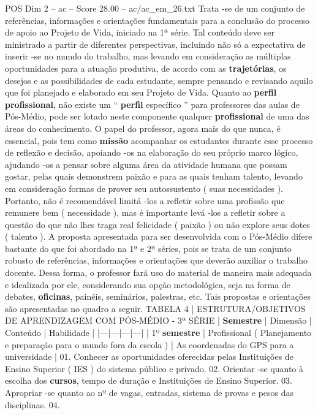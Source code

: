 \begin{textsample}{POS Dim 2 – ac – Score 28.00 – ac/ac\_em\_26.txt}
Trata -se de um conjunto de referências, informações e orientações fundamentais para a conclusão do processo de apoio ao Projeto de Vida, iniciado na 1ª série.
Tal conteúdo deve ser ministrado a partir de diferentes perspectivas, incluindo não só a expectativa de inserir -se no mundo do trabalho, mas levando em consideração as múltiplas oportunidades para a atuação produtiva, de acordo com as \textbf{trajetórias}, os desejos e as possibilidades de cada estudante, sempre pensando e revisando aquilo que foi planejado e elaborado em seu Projeto de Vida.
Quanto ao \textbf{perfil} \textbf{profissional}, não existe um “ \textbf{perfil} específico ” para professores das aulas de Pós-Médio, pode ser lotado neste componente qualquer \textbf{profissional} de uma das áreas do conhecimento.
O papel do professor, agora mais do que nunca, é essencial, pois tem como \textbf{missão} acompanhar os estudantes durante esse processo de reflexão e decisão, apoiando -os na elaboração do seu próprio marco lógico, ajudando -os a pensar sobre alguma área da atividade humana que possam gostar, pelas quais demonstrem paixão e para as quais tenham talento, levando em consideração formas de prover seu autossustento ( suas necessidades ).
Portanto, não é recomendável limitá -los a refletir sobre uma profissão que remunere bem ( necessidade ), mas é importante levá -los a refletir sobre a questão do que não lhes traga real felicidade ( paixão ) ou não explore seus dotes ( talento ).
A proposta apresentada para ser desenvolvida com o Pós-Médio difere bastante do que foi abordado na 1ª e 2ª séries, pois se trata de um conjunto robusto de referências, informações e orientações que deverão auxiliar o trabalho docente.
Dessa forma, o professor fará uso do material de maneira mais adequada e idealizada por ele, considerando sua opção metodológica, seja na forma de debates, \textbf{oficinas}, painéis, seminários, palestras, etc.
Tais propostas e orientações são apresentadas no quadro a seguir.
TABELA 4 | ESTRUTURA/OBJETIVOS DE APRENDIZAGEM COM PÓS-MÉDIO - 3ª SÉRIE | \textbf{Semestre} | Dimensão | Conteúdo | Habilidade | |---|---|---|---| | 1º \textbf{semestre} | Profissional ( Planejamento e preparação para o mundo fora da escola ) | As coordenadas do GPS para a universidade | 01.
Conhecer as oportunidades oferecidas pelas Instituições de Ensino Superior ( IES ) do sistema público e privado. 02.
Orientar -se quanto à escolha dos \textbf{cursos}, tempo de duração e Instituições de Ensino Superior. 03.
Apropriar -se quanto ao nº de vagas, entradas, sistema de provas e pesos das disciplinas. 04.

\end{textsample}
